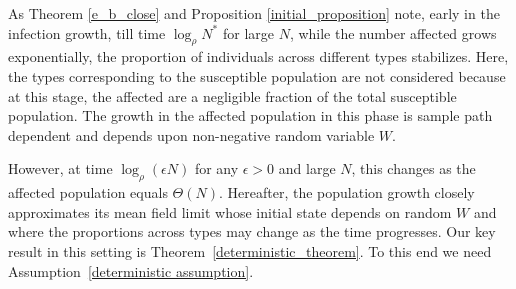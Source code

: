 \documentclass{article}
\theoremstyle{definition}
\begin{document}



As Theorem \ref{e_b_close} and Proposition \ref{initial_proposition} note, early in the infection growth, 
till time $\log_\rho N^*$ for large $N$,
while the number affected grows exponentially, the proportion of individuals across different types stabilizes. Here, the types
corresponding to the susceptible population are not considered because at this stage, the affected are a negligible
fraction of the total susceptible population.  The growth in the affected population in this phase is sample path dependent and depends upon non-negative random variable  $W$. 

However, at time  $\log_{\rho} (\epsilon N)$ for any $\epsilon >0$ and large $N$, this changes as the affected population equals $\Theta(N)$. 
Hereafter, the population growth closely approximates its mean field limit whose initial state depends 
on random $W$ and where the proportions across types may change as the time progresses.
Our key result in this setting is Theorem~\ref{deterministic_theorem}. To this end we need Assumption~\ref{deterministic assumption}. 
\end{document}
